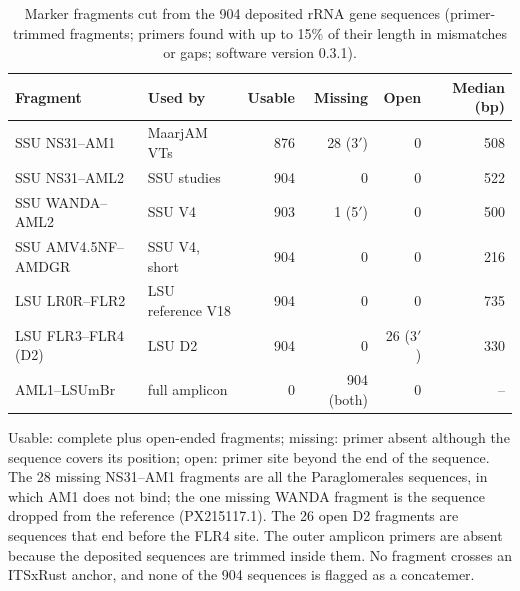 \begin{table}[htbp]\centering
\begin{threeparttable}
\caption{Marker fragments cut from the 904 deposited rRNA gene sequences (primer-trimmed fragments; primers
found with up to 15\% of their length in mismatches or gaps; software version 0.3.1).}
\label{tab:stage1}
\footnotesize\setlength{\tabcolsep}{3pt}
\begin{tabular}{llrrrr}
\toprule
Fragment & Used by & Usable & Missing & Open & Median (bp)\\
\midrule
SSU NS31--AM1        & MaarjAM VTs      & 876 & 28 (3$'$) & 0  & 508\\
SSU NS31--AML2       & SSU studies      & 904 & 0         & 0  & 522\\
SSU WANDA--AML2      & SSU V4           & 903 & 1 (5$'$)  & 0  & 500\\
SSU AMV4.5NF--AMDGR  & SSU V4, short    & 904 & 0         & 0  & 216\\
LSU LR0R--FLR2       & LSU reference V18 & 904 & 0         & 0  & 735\\
LSU FLR3--FLR4 (D2)  & LSU D2           & 904 & 0         & 26 (3$'$) & 330\\
AML1--LSUmBr         & full amplicon    & 0   & 904 (both) & 0 & --\\
\bottomrule
\end{tabular}
\begin{tablenotes}\footnotesize
\item Usable: complete plus open-ended fragments; missing: primer absent although the sequence covers its position;
open: primer site beyond the end of the sequence. The 28 missing NS31--AM1 fragments are all the Paraglomerales sequences,
in which AM1 does not bind; the one missing WANDA fragment is the sequence dropped from the reference (PX215117.1). The
26 open D2 fragments are sequences that end before the FLR4 site. The outer amplicon primers are absent because the
deposited sequences are trimmed inside them. No fragment crosses an ITSxRust anchor, and none of the 904 sequences is
flagged as a concatemer.
\end{tablenotes}
\end{threeparttable}
\end{table}
